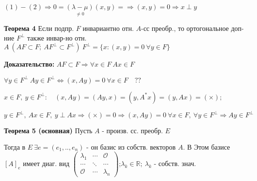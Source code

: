 $(1) - (2) \Rightarrow 0 = \underset{\ne 0}{(\lambda - \mu)}(x,y) =\Rightarrow (x,y)=0 \Rightarrow x\perp y$




\textbf{Теорема 4} Если подпр. $F$ инвариантно отн. $A$-сс преобр., то ортогональное доп-ние $F^\perp$ также инвар-но отн. $A\ (AF\subset F;\ AF^\perp \subset F^\perp)\ F^\perp = \{ x : (x,y)=0\ \forall y \in F \}$

\textbf{Доказательство:} $AF \subset F \Rightarrow \forall x\in F\ Ax \in F$

$\forall y\in F^\perp\ Ay \in F^\perp \Leftrightarrow (x,Ay) = 0\ \forall x\in F\quad ??$

$x \in F,\ y \in F^\perp:\quad (x, Ay) = (Ay, x) = (y, A^*x) = (y, Ax) = (\times); $

$y\in F^\perp,\ Ax \in F,\ y\perp Ax \Rightarrow (\times) = 0 \Rightarrow (x,Ay) = 0\ \forall x \in F,\ \forall y \in F^\perp \Rightarrow Ay \in F^\perp$


\textbf{Теорема 5 (основная)} Пусть $A$ - произв. сс. преобр. $E$

Тогда в $E\ \exists e=(e_1,..,e_n)$ - он базис из собств. векторов $A$. В Этом базисе $[A]_e$ имеет диаг. вид 
$\begin{pmatrix}
  \lambda_1 & \cdots & \mathcal{O} \\
  \cdots & \ddots & \cdots \\
  \mathcal{O} & \cdots & \lambda_n
 \end{pmatrix}
$;\quad $\lambda_k \in \mathbb{R};\ \lambda_k$ - собств. знач.

